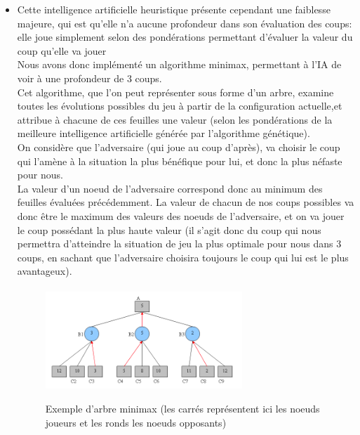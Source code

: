 \documentclass[10pt]{article}
\begin{document}
\begin{enumerate}
\begin{itemize}
\paragraph{}
\item Cette intelligence artificielle heuristique présente cependant une faiblesse majeure, qui est qu'elle n'a aucune profondeur dans son évaluation des coups: elle joue simplement selon des pondérations permettant d'évaluer la valeur du coup qu'elle va jouer \\
Nous avons donc implémenté un algorithme minimax, permettant à l'IA de voir à une profondeur de 3 coups. \\
Cet algorithme, que l'on peut représenter sous forme d'un arbre, examine toutes les évolutions possibles du jeu à partir de la configuration actuelle,et attribue à chacune de ces feuilles une valeur (selon les pondérations de la meilleure intelligence artificielle générée par l'algorithme génétique). \\
On considère que l'adversaire (qui joue au coup d'après), va choisir le coup qui l'amène à la situation la plus bénéfique pour lui, et donc la plus néfaste pour nous. \\
La valeur d'un noeud de l'adversaire correspond donc au minimum des feuilles évaluées précédemment. La valeur de chacun de nos coups possibles va donc être le maximum des valeurs des noeuds de l'adversaire, et on va jouer le coup possédant la plus haute valeur (il s'agit donc du coup qui nous permettra d'atteindre la situation de jeu la plus optimale pour nous dans 3 coups, en sachant que l'adversaire choisira toujours le coup qui lui est le plus avantageux).

\paragraph{}
\begin{figure}[h!]
\centering
\includegraphics[width=0.7\textwidth]{minimax.png}
\caption{ }{Exemple d'arbre minimax (les carrés représentent ici les noeuds joueurs et les ronds les noeuds opposants)}
\end{figure}



\end{itemize}
\end{enumerate}
\end{document}
